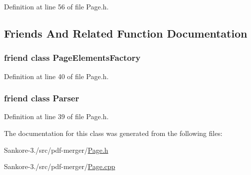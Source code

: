 Definition at line 56 of file Page.\-h.



\subsection{Friends And Related Function Documentation}
\hypertarget{classmerge__lib_1_1_page_ae6313e6ba562663368267af32ecf3ac0}{
\subsubsection[{Page\-Elements\-Factory}]{\setlength{\rightskip}{0pt plus 5cm}friend class Page\-Elements\-Factory\hspace{0.3cm}{\ttfamily [friend]}}}\label{db/d32/classmerge__lib_1_1_page_ae6313e6ba562663368267af32ecf3ac0}


Definition at line 40 of file Page.\-h.

\hypertarget{classmerge__lib_1_1_page_ab80291af9c262f63b83fa9c16f12014d}{
\subsubsection[{Parser}]{\setlength{\rightskip}{0pt plus 5cm}friend class {\bf Parser}\hspace{0.3cm}{\ttfamily [friend]}}}\label{db/d32/classmerge__lib_1_1_page_ab80291af9c262f63b83fa9c16f12014d}


Definition at line 39 of file Page.\-h.



The documentation for this class was generated from the following files\-:\begin{DoxyCompactItemize}
\item 
Sankore-\/3./src/pdf-\/merger/\hyperlink{_page_8h}{Page.\-h}\item 
Sankore-\/3./src/pdf-\/merger/\hyperlink{_page_8cpp}{Page.\-cpp}\end{DoxyCompactItemize}
